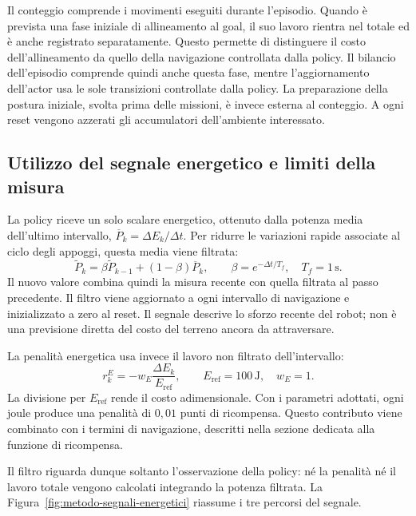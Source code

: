 Il conteggio comprende i movimenti eseguiti durante l'episodio. Quando è prevista una fase iniziale di allineamento al goal, il suo lavoro rientra nel totale ed è anche registrato separatamente. Questo permette di distinguere il costo dell'allineamento da quello della navigazione controllata dalla policy. Il bilancio dell'episodio comprende quindi anche questa fase, mentre l'aggiornamento dell'actor usa le sole transizioni controllate dalla policy. La preparazione della postura iniziale, svolta prima delle missioni, è invece esterna al conteggio. A ogni reset vengono azzerati gli accumulatori dell'ambiente interessato.

\subsection{Utilizzo del segnale energetico e limiti della misura}

La policy riceve un solo scalare energetico, ottenuto dalla potenza media dell'ultimo intervallo, $\overline P_k=\Delta E_k/\Delta t$. Per ridurre le variazioni rapide associate al ciclo degli appoggi, questa media viene filtrata:
\begin{equation}
    \widetilde P_k=\beta\widetilde P_{k-1}
                         +(1-\beta)\overline P_k,
    \qquad \beta=e^{-\Delta t/T_f},\quad T_f=1\,\mathrm{s}.
    \label{eq:metodo-potenza-filtrata}
\end{equation}
Il nuovo valore combina quindi la misura recente con quella filtrata al passo precedente. Il filtro viene aggiornato a ogni intervallo di navigazione e inizializzato a zero al reset. Il segnale descrive lo sforzo recente del robot; non è una previsione diretta del costo del terreno ancora da attraversare.

La penalità energetica usa invece il lavoro non filtrato dell'intervallo:
\begin{equation}
    r_k^{E}=-w_E\frac{\Delta E_k}{E_{\mathrm{ref}}},
    \qquad E_{\mathrm{ref}}=100\,\mathrm{J},\quad w_E=1.
    \label{eq:metodo-penalita-energetica}
\end{equation}
La divisione per $E_{\mathrm{ref}}$ rende il costo adimensionale. Con i parametri adottati, ogni joule produce una penalità di $0{,}01$ punti di ricompensa. Questo contributo viene combinato con i termini di navigazione, descritti nella sezione dedicata alla funzione di ricompensa.

Il filtro riguarda dunque soltanto l'osservazione della policy: né la penalità né il lavoro totale vengono calcolati integrando la potenza filtrata. La Figura~\ref{fig:metodo-segnali-energetici} riassume i tre percorsi del segnale.

